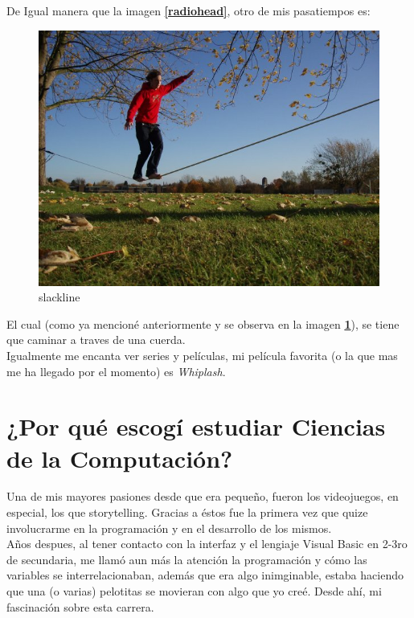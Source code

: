 \clearpage

De Igual manera que la imagen \textbf{\ref{radiohead}}, otro de mis pasatiempos es:

\begin{figure}[H]
  \centering
  \includegraphics[scale=0.3]{./slackline .jpg}
  \caption{slackline}
  \label{slack}
\end{figure}

El cual (como ya mencioné anteriormente y se observa en la imagen \textbf{\ref{slack}}), se tiene que caminar a traves de una cuerda.
\\

Igualmente me encanta ver series y películas, mi película favorita (o la que mas me ha llegado por el momento) es \textit{Whiplash}.

\section{¿Por qué escogí estudiar Ciencias de la Computación?}

Una de mis mayores pasiones desde que era pequeño, fueron los videojuegos, en especial, los que storytelling. Gracias a éstos fue la primera vez
que quize involucrarme en la programación y en el desarrollo de los mismos.
\\

Años despues, al tener contacto con la interfaz y el lengiaje Visual Basic en 2-3ro de secundaria, me llamó aun más la atención la programación y
cómo las variables se interrelacionaban, además que era algo inimginable, estaba haciendo que una (o varias) pelotitas se movieran con algo que yo creé. Desde ahí,
mi fascinación sobre esta carrera.
\\

